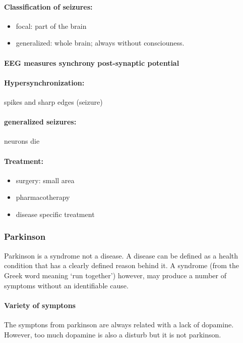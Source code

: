 \documentclass[12pt,article,oneside,a4paper]{memoir}
\begin{document}
\paragraph{Classification of seizures:}
\begin{itemize}
\item focal: part of the brain
\item generalized: whole brain; always without consciouness.
\end{itemize}

\paragraph{EEG measures synchrony post-synaptic potential}

\paragraph{Hypersynchronization:} spikes and sharp edges (seizure)
\paragraph{generalized seizures:} neurons die

\paragraph{Treatment:}
\begin{itemize}
\item surgery: small area
\item pharmacotherapy
\item disease specific treatment
\end{itemize}

\subsubsection{Parkinson}
Parkinson is a syndrome not a disease. A disease can be defined as a health condition that has a clearly defined reason behind it. A syndrome (from the Greek word meaning ‘run together’) however, may produce a number of symptoms without an identifiable cause.

\paragraph{Variety of symptons}
The symptons from parkinson are always related with a lack of dopamine. However, too much dopamine is also a disturb but it is not parkinson.
\end{document}
